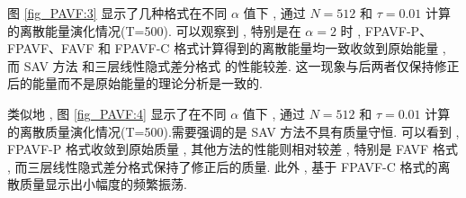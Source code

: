图 \ref{fig_PAVF:3} 显示了几种格式在不同 $\alpha$ 值下 , 通过 $N=512$ 和 $\tau=0.01$ 计算的离散能量演化情况(T=500).
可以观察到 , 特别是在 $\alpha=2$ 时 , FPAVF-P、FPAVF、FAVF 和 FPAVF-C 格式计算得到的离散能量均一致收敛到原始能量 , 
而 SAV 方法 \cite{chengConvergenceEnergyconservingScheme2022} 和三层线性隐式差分格式 \cite{ranLinearlyImplicitConservative2016} 的性能较差.
这一现象与后两者仅保持修正后的能量而不是原始能量的理论分析是一致的.

	类似地 , 图 \ref{fig_PAVF:4} 显示了在不同 $\alpha$ 值下 , 通过 $N=512$ 和 $\tau=0.01$ 计算的离散质量演化情况(T=500).需要强调的是 SAV 方法不具有质量守恒.
可以看到 , FPAVF-P 格式收敛到原始质量 , 其他方法的性能则相对较差 , 特别是 FAVF 格式 , 而三层线性隐式差分格式保持了修正后的质量.
此外 , 基于 FPAVF-C 格式的离散质量显示出小幅度的频繁振荡.


\begin{figure}[H]
	\begin{center}
	 \\
\end{center}
\end{figure}
